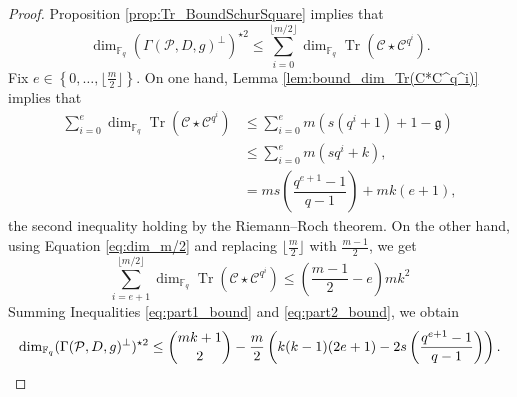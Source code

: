 \documentclass[peerreview]{IEEEtran}
\theoremstyle{plain}
\theoremstyle{definition}
\theoremstyle{remark}
\DeclareMathOperator{\trace}{Tr}
\newcommand{\calP}{\mathcal{P}}
\newcommand{\calC}{\mathcal{C}}
\newcommand{\fq}{\mathbb{F}_{q}}
\newcommand{\Tr}[1]{\trace\!\left(#1\right)}
\newcommand{\set}[1]{\left\{#1\right\}}
\begin{document}
	\begin{proof}
		Proposition \ref{prop:Tr_BoundSchurSquare} implies that
\[			\dim_{\fq}(\Gamma(\calP,D,g)^{\perp})^{\star 2} \leq \sum\limits_{i=0}^{\lfloor m/2 \rfloor} \dim_{\fq} \Tr{\calC \star \calC^{q^i}}.
\]
Fix $e \in \set{0,\dots,\lfloor \frac{m}{2} \rfloor}$. On one hand, Lemma \ref{lem:bound_dim_Tr(C*C^q^i)} implies that
\begin{equation}\label{eq:part1_bound}
\begin{aligned}
	\sum\limits_{i=0}^{e} \dim_{\fq} \Tr{\calC \star \calC^{q^i}} 	& \leq \sum\limits_{i=0}^{e} m(s(q^i+1)+1-\mathfrak{g}) \\
																	& \leq \sum\limits_{i=0}^{e} m(sq^i+k),\\
																	&= ms\left(\dfrac{q^{e+1}-1}{q-1}\right)+mk(e+1),
\end{aligned}
\end{equation}
 the second inequality holding by the Riemann--Roch theorem. On the other hand, using Equation \eqref{eq:dim_m/2} and replacing $\lfloor \frac{m}{2} \rfloor$ with $\frac{m-1}{2}$, we get
\begin{equation}\label{eq:part2_bound}
	\sum\limits_{i=e+1}^{\lfloor m/2 \rfloor} \dim_{\fq} \Tr{\calC \star \calC^{q^i}} \leq \left( \frac{m-1}{2} -e \right)mk^2
\end{equation}
Summing Inequalities \eqref{eq:part1_bound} and \eqref{eq:part2_bound}, we obtain
\[		\dim_{\fq}(\Gamma(\calP,D,g)^{\perp})^{\star 2} \leq  \binom{mk+1}{2} \\-  \dfrac{m}{2}\left(k(k-1)(2e+1)-2s\left(\dfrac{q^{e+1}-1}{q-1}\right)\right).\]

\end{proof}
\end{document}
